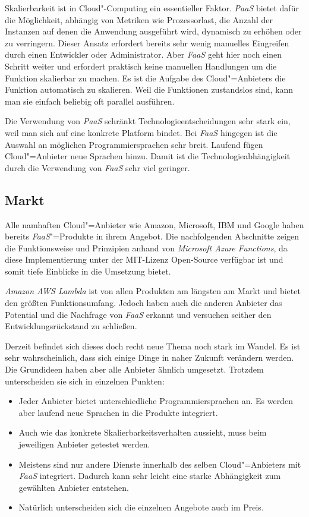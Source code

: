 Skalierbarkeit ist in Cloud"-Computing ein essentieller Faktor. \textit{PaaS} bietet dafür die Möglichkeit, abhängig von Metriken wie Prozessorlast, die Anzahl der Instanzen auf denen die Anwendung ausgeführt wird, dynamisch zu erhöhen oder zu verringern. Dieser Ansatz erfordert bereits sehr wenig manuelles Eingreifen durch einen Entwickler oder Administrator. Aber \textit{FaaS} geht hier noch einen Schritt weiter und erfordert praktisch keine manuellen Handlungen um die Funktion skalierbar zu machen. Es ist die Aufgabe des Cloud"=Anbieters die Funktion automatisch zu skalieren. Weil die Funktionen zustandslos sind, kann man sie einfach beliebig oft parallel ausführen.

Die Verwendung von \textit{PaaS} schränkt Technologieentscheidungen sehr stark ein, weil man sich auf eine konkrete Platform bindet. Bei \textit{FaaS} hingegen ist die Auswahl an möglichen Programmiersprachen sehr breit. Laufend fügen Cloud"=Anbieter neue Sprachen hinzu. Damit ist die Technologieabhängigkeit durch die Verwendung von \textit{FaaS} sehr viel geringer.

\subsection{Markt}

Alle namhaften Cloud"=Anbieter wie Amazon, Microsoft, IBM und Google haben bereits \textit{FaaS}"=Produkte in ihrem Angebot. Die nachfolgenden Abschnitte zeigen die Funktionsweise und Prinzipien anhand von \textit{Microsoft Azure Functions}, da diese Implementierung unter der MIT-Lizenz Open-Source verfügbar ist und somit tiefe Einblicke in die Umsetzung bietet. 

\textit{Amazon AWS Lambda} ist von allen Produkten am längsten am Markt und bietet den größten Funktionsumfang. Jedoch haben auch die anderen Anbieter das Potential und die Nachfrage von \textit{FaaS} erkannt und versuchen seither den Entwicklungsrückstand zu schließen.

Derzeit befindet sich dieses doch recht neue Thema noch stark im Wandel. Es ist sehr wahrscheinlich, dass sich einige Dinge in naher Zukunft verändern werden. Die Grundideen haben aber alle Anbieter ähnlich umgesetzt. Trotzdem unterscheiden sie sich in einzelnen Punkten:

\begin{itemize}
	\item Jeder Anbieter bietet unterschiedliche Programmiersprachen an. Es werden aber laufend neue Sprachen in die Produkte integriert.
	\item Auch wie das konkrete Skalierbarkeitsverhalten aussieht, muss beim jeweiligen Anbieter getestet werden.
	\item Meistens sind nur andere Dienste innerhalb des selben Cloud"=Anbieters mit \textit{FaaS} integriert. Dadurch kann sehr leicht eine starke Abhängigkeit zum gewählten Anbieter entstehen.
	\item Natürlich unterscheiden sich die einzelnen Angebote auch im Preis.
\end{itemize}

